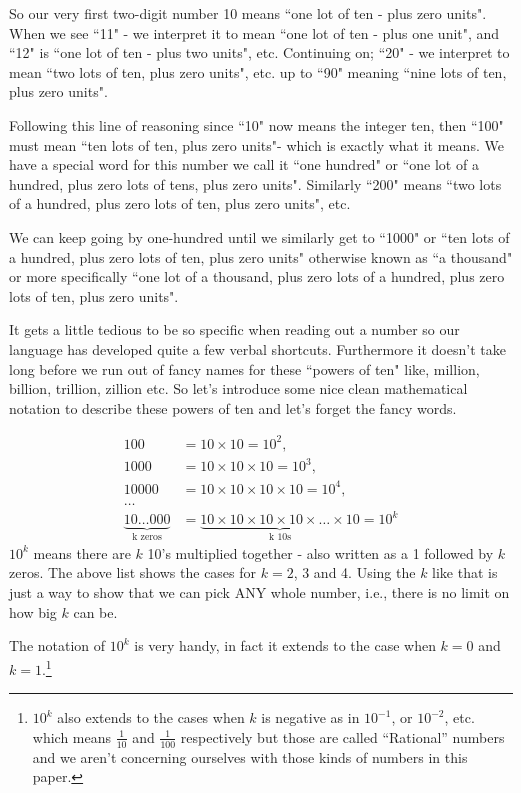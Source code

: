 \documentclass{article}
\begin{document}
So our very first two-digit number 10 means ``one lot of ten - plus zero units".
When we see ``11" - we interpret it to mean ``one lot of ten - plus one unit",
and ``12" is ``one lot of ten - plus two units", etc.
Continuing on; ``20" - we interpret to mean ``two lots of ten,
plus zero units", etc. up to ``90" meaning ``nine lots of ten,
plus zero units".

Following this line of reasoning since ``10" now means the integer ten,
then ``100" must mean ``ten lots of ten,
plus zero units"- which is exactly what it means.
We have a special word for this number we call it ``one hundred" or ``one lot of a hundred,
plus zero lots of tens, plus zero units".
Similarly ``200" means ``two lots of a hundred, plus zero lots of ten,
plus zero units", etc.

We can keep going by one-hundred until we similarly get to ``1000" or ``ten lots of a hundred,
plus zero lots of ten, plus zero units" otherwise known
as ``a thousand" or more specifically ``one lot of a thousand,
plus zero lots of a hundred, plus zero lots of ten, plus zero units".

It gets a little tedious to be so specific when reading out
a number so our language has developed quite a few verbal shortcuts.
Furthermore it doesn't take long before we run out of fancy names
for these ``powers of ten" like, million, billion, trillion,
zillion etc. So let's introduce some nice clean mathematical notation
to describe these powers of ten and let's forget the fancy words.

\begin{align*}
100&=10\times10=10^2,\\
1000&= 10\times10\times10=10^3,\\
10000&= 10\times10\times10\times10=10^4,\\
\dots{}\\
\underbrace{10\dots{}000}_\text{k zeros}&= \underbrace{10\times10\times10\times10\times\dots{}\times10}_\text{k 10s}=10^k
\end{align*}
$10^k$ means there are $k$ 10's multiplied together - 
also written as a 1 followed by $k$ zeros.
The above list shows the cases for $k = 2$, 3 and 4.
Using the $k$ like that is just a way to show that we can pick ANY whole number,
i.e., there is no limit on how big $k$ can be.

The notation of $10^k$ is very handy, in fact it extends
to the case when $k=0$ and $k=1$.\footnote{$10^k$ also extends to the cases
when $k$ is negative as in $10^{-1}$, or $10^{-2}$, etc. which means $\frac{1}{10}$ and $\frac{1}{100}$ respectively
but those are called ``Rational'' numbers and we aren't concerning ourselves with those kinds of numbers in this paper.}
\end{document}
